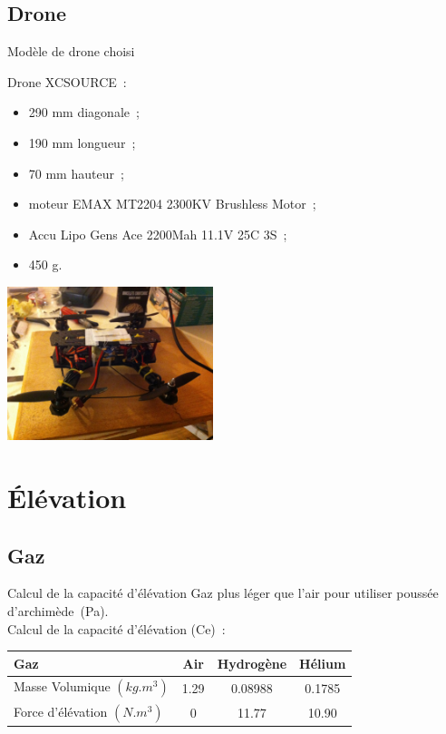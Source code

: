 \documentclass{beamer}
\begin{document}
\subsection{Drone}

\begin{frame}{Modèle de drone choisi}
  \begin{multicols}{2}
    Drone XCSOURCE~: \\
    \begin{itemize}
      \item 290 mm diagonale~;
      \item 190 mm longueur~;
      \item 70 mm hauteur~;
      \item moteur EMAX MT2204 2300KV Brushless Motor~;
      \item Accu Lipo Gens Ace 2200Mah 11.1V 25C 3S~;
      \item 450 g.
    \end{itemize}
    \newpage
    \begin{center}
      \includegraphics[width=6cm]{../Images/drone.JPG}
    \end{center}
  \end{multicols}
\end{frame}

\section{Élévation}

\subsection{Gaz}

\begin{frame}{Calcul de la capacité d'élévation}
	Gaz plus léger que l'air pour utiliser poussée d'archimède~(Pa).\\
  Calcul de la capacité d'élévation (Ce)~:
	\begin{center}
	\end{center}

	\begin{tabular}{|l|c|c|c|}
		\hline
		Gaz & Air & Hydrogène & Hélium \\
		\hline
		Masse Volumique $(kg.m^3)$ & 1.29 & 0.08988 & 0.1785 \\
		\hline
		Force d'élévation $(N.m^3)$ & 0 & 11.77 & 10.90 \\
		\hline
	\end{tabular}

\end{frame}
\end{document}
